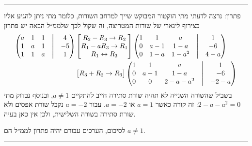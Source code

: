 \documentclass[12pt, a4paper]{article}
\begin{document}
\begin{enumerate}
\begin{enumerate}
\end{enumerate}


\noindent\rule{\textwidth-30pt}{0.4pt}


פתרון:
נרצה לדעתי מתי הוקטור המבוקש שייך למרחב השורות, כלומר מתי ניתן להגיע אליו כצירוף לינארי של שורות המטריצה, זה שקול לכך שלממ״ל הבאה יש פתרון
\begin{align*}
   \begin{pmatrix}
    a&1&1&\bigm| &4 \\
    1 & a & 1& \bigm|&-5 \\
    1 & 1 & a& \bigm|& 1 \\
\end{pmatrix} 
&\begin{bmatrix}
    R_2-R_3\rightarrow R_2\\
    R_1-aR_3\rightarrow R_1\\
    R_1\leftrightarrow R_3\\
\end{bmatrix}
\begin{pmatrix}
1 & 1 & a& \bigm|& 1 \\
 0 & a-1 & 1-a& \bigm|&-6 \\
    0&1-a&1-a^2&\bigm| &4-a \\
\end{pmatrix} 
\\&\begin{bmatrix}
    R_3+R_2\rightarrow R_3\\
\end{bmatrix}
\begin{pmatrix}
1 & 1 & a& \bigm|& 1 \\
    0&a-1&1-a&\bigm| &-6 \\
    0 & 0 & 2-a-a^2& \bigm|&-2-a \\
\end{pmatrix} 
\end{align*}
בשביל שהשורה השנייה לא תהיה שורת סתירה חייב להתקיים
$a\neq 1$,
ובנוסף נבדוק מתי
$2-a-a^2=0$:
זה קורה כאשר
$a=1$
או
$a=-2$.
עבור
$a=-2$
נקבל שורת אפסים ולא שורת סתירה בשורה השלישית, ולכן אין כאן בעיה.

לסיכום, הערכים עבורם יהיה פתרון לממ״ל הם 
$a\neq1$.

\noindent\rule{\textwidth-30pt}{0.4pt}



\end{enumerate}
\end{document}
